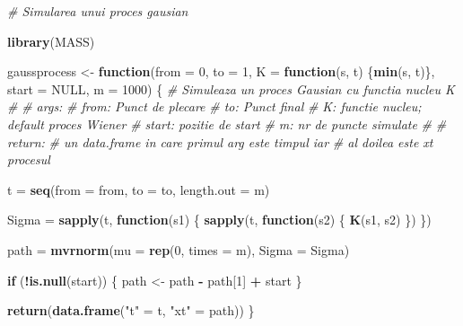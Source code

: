 \documentclass[]{article}
\newenvironment{Shaded}{\begin{snugshade}}{\end{snugshade}}
\newcommand{\KeywordTok}[1]{\textcolor[rgb]{0.13,0.29,0.53}{\textbf{#1}}}
\newcommand{\DataTypeTok}[1]{\textcolor[rgb]{0.13,0.29,0.53}{#1}}
\newcommand{\DecValTok}[1]{\textcolor[rgb]{0.00,0.00,0.81}{#1}}
\newcommand{\StringTok}[1]{\textcolor[rgb]{0.31,0.60,0.02}{#1}}
\newcommand{\CommentTok}[1]{\textcolor[rgb]{0.56,0.35,0.01}{\textit{#1}}}
\newcommand{\OtherTok}[1]{\textcolor[rgb]{0.56,0.35,0.01}{#1}}
\newcommand{\ControlFlowTok}[1]{\textcolor[rgb]{0.13,0.29,0.53}{\textbf{#1}}}
\newcommand{\OperatorTok}[1]{\textcolor[rgb]{0.81,0.36,0.00}{\textbf{#1}}}
\newcommand{\NormalTok}[1]{#1}
\begin{document}
\begin{Shaded}
\begin{Highlighting}[]
\CommentTok{# Simularea unui proces gausian}

\KeywordTok{library}\NormalTok{(MASS)}
 
\NormalTok{gaussprocess <-}\StringTok{ }\ControlFlowTok{function}\NormalTok{(}\DataTypeTok{from =} \DecValTok{0}\NormalTok{, }\DataTypeTok{to =} \DecValTok{1}\NormalTok{, }
                         \DataTypeTok{K =} \ControlFlowTok{function}\NormalTok{(s, t) \{}\KeywordTok{min}\NormalTok{(s, t)\},}
                         \DataTypeTok{start =} \OtherTok{NULL}\NormalTok{, }\DataTypeTok{m =} \DecValTok{1000}\NormalTok{) \{}
  \CommentTok{# Simuleaza un proces Gausian cu functia nucleu K}
  \CommentTok{#}
  \CommentTok{# args:}
  \CommentTok{#   from: Punct de plecare}
  \CommentTok{#   to: Punct final }
  \CommentTok{#   K: functie nucleu; default proces Wiener}
  \CommentTok{#   start: pozitie de start}
  \CommentTok{#   m: nr de puncte simulate }
  \CommentTok{#}
  \CommentTok{# return:}
  \CommentTok{#   un data.frame in care primul arg este timpul iar }
  \CommentTok{#   al doilea este xt procesul }
   
\NormalTok{  t =}\StringTok{ }\KeywordTok{seq}\NormalTok{(}\DataTypeTok{from =}\NormalTok{ from, }\DataTypeTok{to =}\NormalTok{ to, }\DataTypeTok{length.out =}\NormalTok{ m)}
  
\NormalTok{  Sigma =}\StringTok{ }\KeywordTok{sapply}\NormalTok{(t, }\ControlFlowTok{function}\NormalTok{(s1) \{}
    \KeywordTok{sapply}\NormalTok{(t, }\ControlFlowTok{function}\NormalTok{(s2) \{}
      \KeywordTok{K}\NormalTok{(s1, s2)}
\NormalTok{    \})}
\NormalTok{  \})}
   
\NormalTok{  path =}\StringTok{ }\KeywordTok{mvrnorm}\NormalTok{(}\DataTypeTok{mu =} \KeywordTok{rep}\NormalTok{(}\DecValTok{0}\NormalTok{, }\DataTypeTok{times =}\NormalTok{ m), }\DataTypeTok{Sigma =}\NormalTok{ Sigma)}
  
  \ControlFlowTok{if}\NormalTok{ (}\OperatorTok{!}\KeywordTok{is.null}\NormalTok{(start)) \{}
\NormalTok{    path <-}\StringTok{ }\NormalTok{path }\OperatorTok{-}\StringTok{ }\NormalTok{path[}\DecValTok{1}\NormalTok{] }\OperatorTok{+}\StringTok{ }\NormalTok{start  }
\NormalTok{  \}}
   
  \KeywordTok{return}\NormalTok{(}\KeywordTok{data.frame}\NormalTok{(}\StringTok{"t"}\NormalTok{ =}\StringTok{ }\NormalTok{t, }\StringTok{"xt"}\NormalTok{ =}\StringTok{ }\NormalTok{path))}
\NormalTok{\}}
\end{Highlighting}
\end{Shaded}
\end{document}

